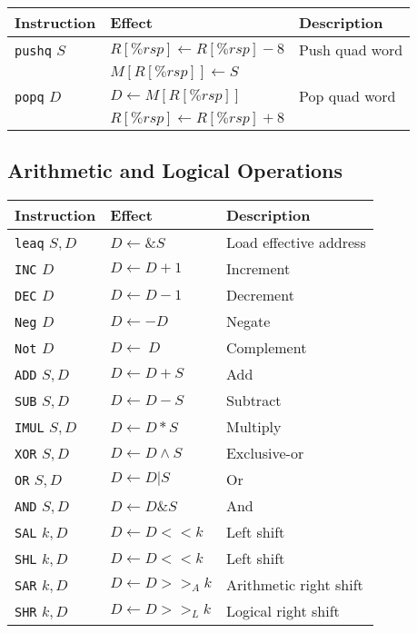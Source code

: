 \documentclass[10pt]{armath}
\newcommand{\s}[1]{\texttt{#1}}
\begin{document}
\begin{center}
  \begin{tabular}{l l l}
    Instruction & Effect & Description\\
    \hline
    \s{pushq} $S$ & $R[\%rsp]\leftarrow R[\%rsp]-8$ & Push quad word\\
                  & $M[R[\%rsp]]\leftarrow S$ & \\
    \s{popq} $D$ & $D\leftarrow M[R[\%rsp]]$ & Pop quad word\\
                 & $R[\%rsp]\leftarrow R[\%rsp] + 8$ &\\
                 \hline
  \end{tabular}
\end{center}

\subsection{Arithmetic and Logical Operations}%
\label{sub:arithmetic_and_logical_operations}

\begin{center}
  \begin{tabular}{l l l}
    \hline
    Instruction & Effect & Description\\
    \hline
    \hline
    \s{leaq} $S,D$ & $D\leftarrow \&S$ & Load effective address\\
    \hline
    \s{INC} $D$ & $D\leftarrow D+1$ & Increment\\
    \s{DEC} $D$ & $D\leftarrow D-1$ & Decrement\\
    \s{Neg} $D$ & $D\leftarrow -D$ & Negate\\
    \s{Not} $D$ & $D\leftarrow ~D$ & Complement\\
    \hline
    \s{ADD} $S,D$ & $D\leftarrow D+S$ & Add\\
    \s{SUB} $S,D$ & $D\leftarrow D-S$ & Subtract\\
    \s{IMUL} $S,D$ & $D\leftarrow D*S$ & Multiply\\
    \s{XOR} $S,D$ & $D\leftarrow D\wedge S$ & Exclusive-or\\
    \s{OR} $S,D$ & $D\leftarrow D|S$ & Or\\
    \s{AND} $S,D$ & $D\leftarrow D\&S$ & And\\
    \hline
    \s{SAL} $k,D$ & $D\leftarrow D<<k$ & Left shift\\
    \s{SHL} $k,D$ & $D\leftarrow D<<k$ & Left shift\\
    \s{SAR} $k,D$ & $D\leftarrow D>>_Ak$ & Arithmetic right shift\\
    \s{SHR} $k,D$ & $D\leftarrow D>>_Lk$ & Logical right shift\\
    \hline
  \end{tabular}
\end{center}
\end{document}
